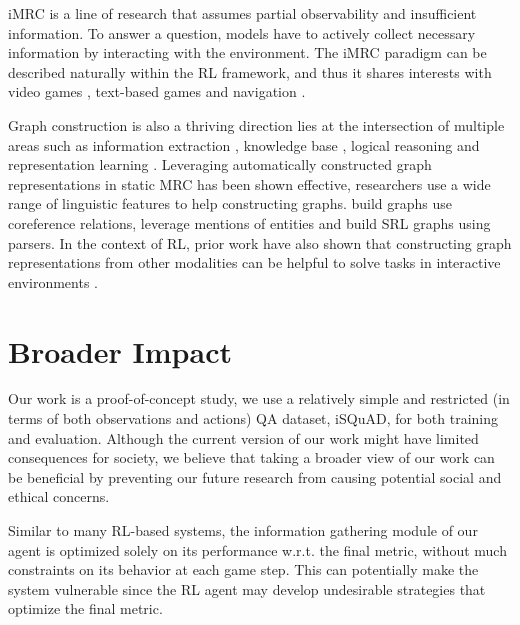 \documentclass[11pt]{article}
\newcommand{\isquad}{iSQuAD\xspace}
\newcommand{\imrc}{iMRC\xspace}
\begin{document}
\imrc \citep{yuan2020imrc} is a line of research that assumes partial observability and insufficient information.
To answer a question, models have to actively collect necessary information by interacting with the environment.
The \imrc paradigm can be described naturally within the RL framework, and thus it shares interests with video games \citep{badia20agent57}, text-based games \citep{ammanabrolu19graph,adhikari2020gata} and navigation \citep{mattersim,shridhar2020alfred}.

Graph construction is also a thriving direction lies at the intersection of multiple areas such as information extraction \citep{angeli2015leveraging}, knowledge base \citep{shin2015incremental}, logical reasoning \citep{sinha2019clutrr} and representation learning \citep{Kipf2020Contrastive}. 
Leveraging automatically constructed graph representations in static MRC has been shown effective, researchers use a wide range of linguistic features to help constructing graphs.
\citet{dhingra2018neural,song2018exploring} build graphs use coreference relations,
\citet{de2018question,qiu2019dynamically,tu2020select} leverage mentions of entities and
\citet{zheng2020srlgrn} build SRL graphs using parsers. 
In the context of RL, prior work have also shown that constructing graph representations from other modalities can be helpful to solve tasks in interactive environments \citep{johnson2016learning,Yang2018GLoMoUL,ammanabrolu19graph,adhikari2020gata}. 


\section{Broader Impact}
\label{section:impact}

Our work is a proof-of-concept study, we use a relatively simple and restricted (in terms of both observations and actions) QA dataset, \isquad, for both training and evaluation. 
Although the current version of our work might have limited consequences for society, we believe that taking a broader view of our work can be beneficial by preventing our future research from causing potential social and ethical concerns.

Similar to many RL-based systems, the information gathering module of our agent is optimized solely on its performance w.r.t. the final metric, without much constraints on its behavior at each game step.
This can potentially make the system vulnerable since the RL agent may develop undesirable strategies that optimize the final metric.
\end{document}
